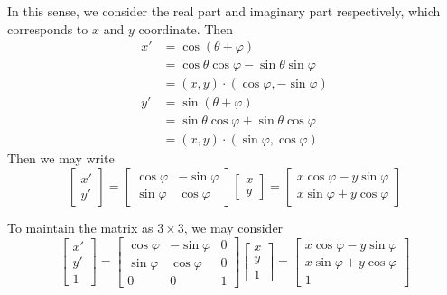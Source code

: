 \documentclass[12pt]{article}
\begin{document}
    In this sense, we consider the real part and imaginary part respectively, which corresponds to $x$ and $y$ coordinate. Then 
    \begin{align*}
        x'&=\cos(\theta+\varphi)\\
        &=\cos{\theta}\cos{\varphi}-\sin{\theta}\sin{\varphi}\\
        &=(x,y)\cdot(\cos{\varphi},-\sin{\varphi})\\
        y'&=\sin(\theta+\varphi)\\
        &=\sin{\theta}\cos{\varphi}+\sin{\theta}\cos{\varphi}\\
        &=(x,y)\cdot(\sin{\varphi},\cos{\varphi})
    \end{align*} 
    Then we may write $$\begin{bmatrix}
        x'\\y'
    \end{bmatrix}=\begin{bmatrix}
        \cos{\varphi}&-\sin{\varphi}\\\sin{\varphi}&\cos{\varphi}
    \end{bmatrix}\begin{bmatrix}
        x\\y
    \end{bmatrix}=\begin{bmatrix}
        x\cos{\varphi}-y\sin{\varphi}\\x\sin{\varphi}+y\cos{\varphi}
    \end{bmatrix}$$

    To maintain the matrix as $3\times 3$, we may consider $$\begin{bmatrix}
        x'\\y'\\1
    \end{bmatrix}=\begin{bmatrix}
        \cos{\varphi}&-\sin{\varphi}&0\\\sin{\varphi}&\cos{\varphi}&0\\0&0&1
    \end{bmatrix}\begin{bmatrix}
        x\\y\\1
    \end{bmatrix}=\begin{bmatrix}
        x\cos{\varphi}-y\sin{\varphi}\\x\sin{\varphi}+y\cos{\varphi}\\1
    \end{bmatrix}$$
\end{document}
